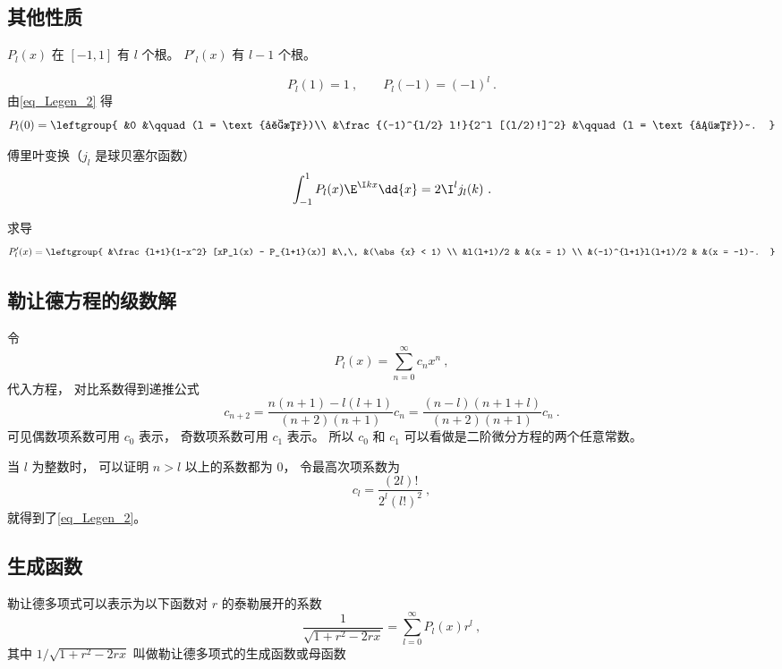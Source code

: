 \subsection{其他性质}

$P_l(x)$ 在 $[-1,1]$ 有 $l$ 个根。 $P'_l(x)$ 有 $l-1$ 个根。

\begin{equation}
P_l(1) = 1~, \qquad P_l(-1) = (-1)^l~.
\end{equation}
由\autoref{eq_Legen_2} 得
\begin{equation}\label{eq_Legen_5}
P_l(0) = \leftgroup{
&0 &\qquad (l = \text{奇数})\\
&\frac{(-1)^{l/2} l!}{2^l [(l/2)!]^2} &\qquad (l = \text{偶数})~.
}\end{equation}

傅里叶变换（$j_l$ 是球贝塞尔函数）
\begin{equation}\label{eq_Legen_3}
\int_{-1}^1 P_l(x) \E^{\I k x} \dd{x} = 2 \I^l j_l(k)~.
\end{equation}

求导
\begin{equation}\label{eq_Legen_6} %
P'_l(x) = \leftgroup{
    &\frac{l+1}{1-x^2} [xP_l(x) - P_{l+1}(x)] &\,\, &(\abs{x} < 1) \\
    &l(l+1)/2 & &(x = 1) \\
    &(-1)^{l+1}l(l+1)/2 & &(x = -1)~.
}\end{equation}

\subsection{勒让德方程的级数解}
令
\begin{equation}
P_l(x) = \sum_{n = 0}^\infty c_n x^n~,
\end{equation}
代入方程， 对比系数得到递推公式
\begin{equation}
c_{n+2} = \frac{n(n+1)-l(l+1)}{(n+2)(n+1)}c_n = \frac{(n-l)(n+1+l)}{(n+2)(n+1)}c_n~.
\end{equation}
可见偶数项系数可用 $c_0$ 表示， 奇数项系数可用 $c_1$ 表示。 所以 $c_0$ 和 $c_1$ 可以看做是二阶微分方程的两个任意常数。

当 $l$ 为整数时， 可以证明 $n > l$ 以上的系数都为 0， 令最高次项系数为
\begin{equation}
c_l = \frac{(2l)!}{2^l (l!)^2}~,
\end{equation}
就得到了\autoref{eq_Legen_2}。

\subsection{生成函数}
勒让德多项式可以表示为以下函数对 $r$ 的泰勒展开的系数
\begin{equation}
\frac{1}{\sqrt{1 + r^2 - 2rx}} = \sum_{l = 0}^\infty P_l(x) r^l~,
\end{equation}
其中 $1/\sqrt {1+ r^2 - 2rx}$ 叫做勒让德多项式的生成函数或母函数